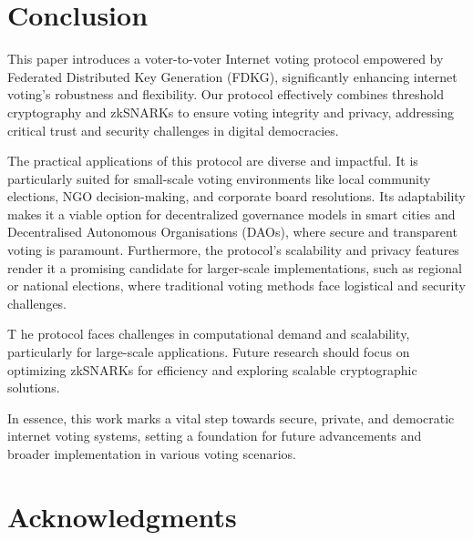 \documentclass[runningheads]{llncs}
\begin{document}
\section{Conclusion}

This paper introduces a voter-to-voter Internet voting protocol empowered by Federated Distributed Key Generation (FDKG), significantly enhancing internet voting's robustness and flexibility. Our protocol effectively combines threshold cryptography and zkSNARKs to ensure voting integrity and privacy, addressing critical trust and security challenges in digital democracies.

The practical applications of this protocol are diverse and impactful. It is particularly suited for small-scale voting environments like local community elections, NGO decision-making, and corporate board resolutions. Its adaptability makes it a viable option for decentralized governance models in smart cities and Decentralised Autonomous Organisations (DAOs), where secure and transparent voting is paramount. Furthermore, the protocol's scalability and privacy features render it a promising candidate for larger-scale implementations, such as regional or national elections, where traditional voting methods face logistical and security challenges.

T he protocol faces challenges in computational demand and scalability, particularly for large-scale applications. Future research should focus on optimizing zkSNARKs for efficiency and exploring scalable cryptographic solutions.

In essence, this work marks a vital step towards secure, private, and democratic internet voting systems, setting a foundation for future advancements and broader implementation in various voting scenarios.

\section{Acknowledgments}




\end{document}
